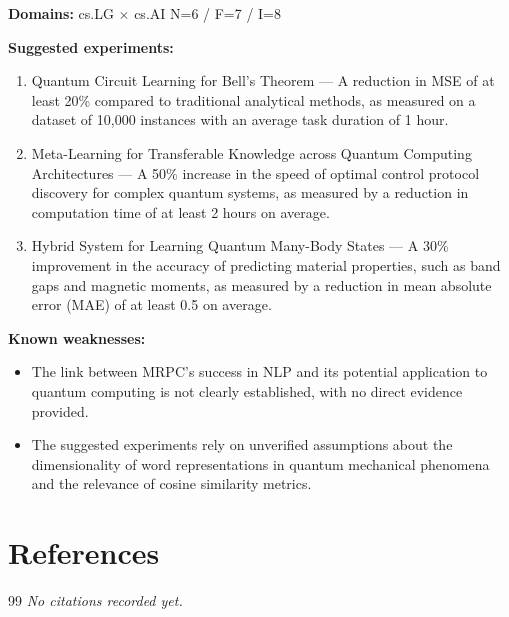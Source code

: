 \documentclass[12pt,a4paper]{article}
\begin{document}
\noindent\textbf{Domains:} cs.LG $\times$ cs.AI
\hspace{1em} N=6 / F=7 / I=8

\textbf{Suggested experiments:}
\begin{enumerate}
  \item Quantum Circuit Learning for Bell's Theorem — A reduction in MSE of at least 20\% compared to traditional analytical methods, as measured on a dataset of 10,000 instances with an average task duration of 1 hour.
  \item Meta-Learning for Transferable Knowledge across Quantum Computing Architectures — A 50\% increase in the speed of optimal control protocol discovery for complex quantum systems, as measured by a reduction in computation time of at least 2 hours on average.
  \item Hybrid System for Learning Quantum Many-Body States — A 30\% improvement in the accuracy of predicting material properties, such as band gaps and magnetic moments, as measured by a reduction in mean absolute error (MAE) of at least 0.5 on average.
\end{enumerate}

\textbf{Known weaknesses:}
\begin{itemize}
  \item The link between MRPC's success in NLP and its potential application to quantum computing is not clearly established, with no direct evidence provided.
  \item The suggested experiments rely on unverified assumptions about the dimensionality of word representations in quantum mechanical phenomena and the relevance of cosine similarity metrics.
\end{itemize}


\section{References}

\begin{thebibliography}{99}
\textit{No citations recorded yet.}
\end{thebibliography}
\end{document}
